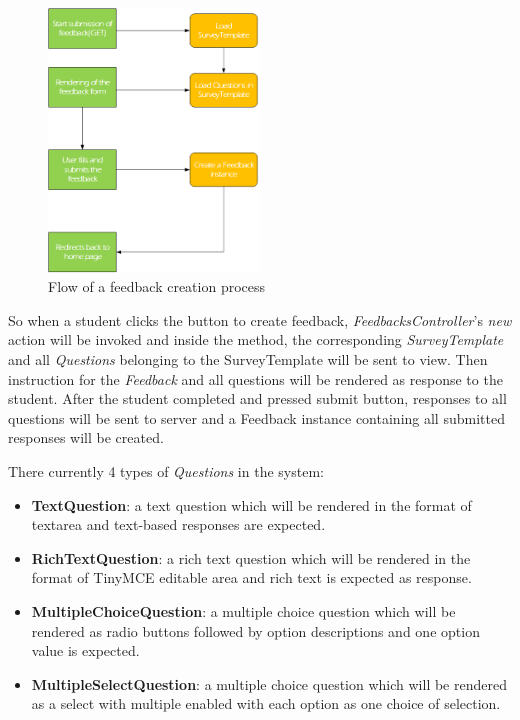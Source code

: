 \begin{figure}[h]
  \centering
  \includegraphics[width=0.5\textwidth]{Images/Skylab_Feedback_Flow.png}
  \caption{Flow of a feedback creation process}
  \label{fig:FeedbackFlow}
\end{figure}

So when a student clicks the button to create feedback, \textit{FeedbacksController}'s \textit{new} action will be invoked and inside the method, the corresponding \textit{SurveyTemplate} and all \textit{Questions} belonging to the SurveyTemplate will be sent to view. Then instruction for the \textit{Feedback} and all questions will be rendered as response to the student. After the student completed and pressed submit button, responses to all questions will be sent to server and a Feedback instance containing all submitted responses will be created.

There currently 4 types of \textit{Questions} in the system:

\begin{itemize}
  \item \textbf{TextQuestion}: a text question which will be rendered in the format of textarea and text-based responses are expected. 
  \item \textbf{RichTextQuestion}: a rich text question which will be rendered in the format of TinyMCE editable area and rich text is expected as response.
  \item \textbf{MultipleChoiceQuestion}: a multiple choice question which will be rendered as radio buttons followed by option descriptions and one option value is expected.
  \item \textbf{MultipleSelectQuestion}: a multiple choice question which will be rendered as a select with multiple enabled with each option as one choice of selection.
\end{itemize}

